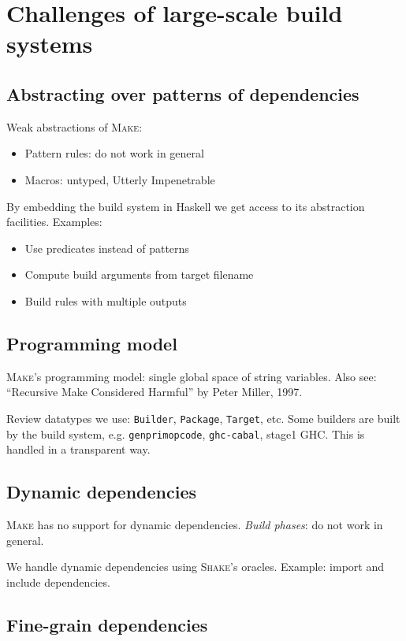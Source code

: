 \section{Challenges of large-scale build systems}

\subsection{Abstracting over patterns of dependencies}

Weak abstractions of \textsc{Make}:
\begin{itemize}
  \item Pattern rules: do not work in general
  \item Macros: untyped, Utterly Impenetrable 
\end{itemize}

By embedding the build system in Haskell we get access to its abstraction
facilities. Examples:
\begin{itemize}
  \item Use predicates instead of patterns
  \item Compute build arguments from target filename
  \item Build rules with multiple outputs
\end{itemize}

\subsection{Programming model}

\textsc{Make}'s programming model: single global space of string variables. Also
see: ``Recursive Make Considered Harmful'' by Peter Miller, 1997.

\noindent Review datatypes we use: \texttt{Builder}, \texttt{Package},
\texttt{Target}, etc. Some builders are built by the build system, e.g.
\texttt{genprimopcode}, \texttt{ghc-cabal}, stage1 GHC. This is handled in a
transparent way.

\subsection{Dynamic dependencies}

\textsc{Make} has no support for dynamic dependencies. \emph{Build phases}: do
not work in general.

We handle dynamic dependencies using \textsc{Shake}'s oracles. Example: import
and include dependencies.

\subsection{Fine-grain dependencies}

